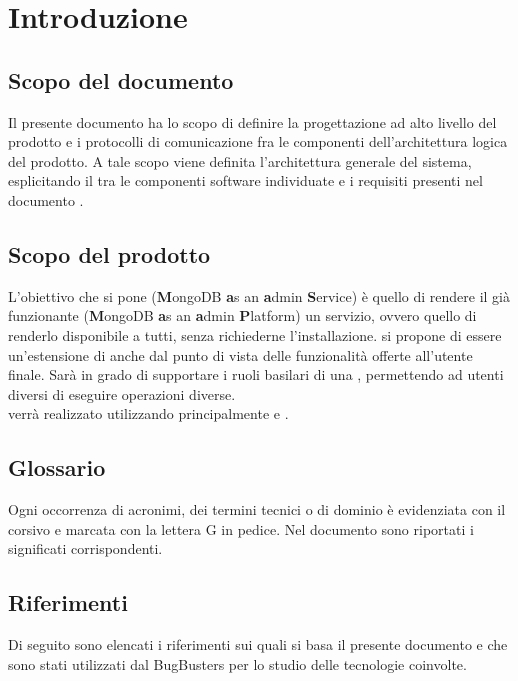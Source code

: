 \section{Introduzione}
\subsection{Scopo del documento}
Il presente documento ha lo scopo di definire la progettazione ad alto livello del prodotto  e i protocolli di comunicazione fra le componenti dell'architettura logica del prodotto. A tale scopo viene definita l'architettura generale del sistema, esplicitando il  tra le componenti software individuate e i requisiti presenti nel documento \AnalisiDeiRequisiti. 

\subsection{Scopo del prodotto}
L'obiettivo che si pone  (\textbf{M}ongoDB \textbf{a}s an \textbf{a}dmin \textbf{S}ervice) è quello di rendere il già funzionante  (\textbf{M}ongoDB \textbf{a}s an \textbf{a}dmin \textbf{P}latform) un servizio, ovvero quello di renderlo disponibile a tutti, senza richiederne l'installazione.  si propone di essere un'estensione di  anche dal punto di vista delle funzionalità offerte all'utente finale. Sarà in grado di supportare i ruoli basilari di una , permettendo ad utenti diversi di eseguire operazioni diverse. \\
 verrà realizzato utilizzando principalmente  e .

\subsection{Glossario}
Ogni occorrenza di acronimi, dei termini tecnici o di dominio è evidenziata con il corsivo e marcata con la lettera G in pedice. Nel documento \Glossario sono riportati i significati corrispondenti.

\subsection{Riferimenti}
Di seguito sono elencati i riferimenti sui quali si basa il presente documento e che sono stati utilizzati dal  BugBusters per lo studio delle tecnologie coinvolte.

